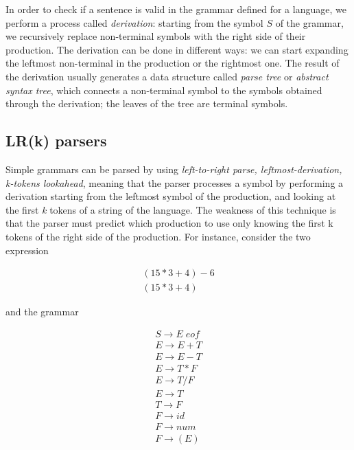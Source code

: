 In order to check if a sentence is valid in the grammar defined for a language, we perform a process called \textit{derivation}: starting from the symbol $S$ of the grammar, we recursively replace non-terminal symbols with the right side of their production. The derivation can be done in different ways: we can start expanding the leftmost non-terminal in the production or the rightmost one. The result of the derivation usually generates a data structure called \textit{parse tree} or \textit{abstract syntax tree}, which connects a non-terminal symbol to the symbols obtained through the derivation; the leaves of the tree are terminal symbols.

\subsection{LR(k) parsers}
Simple grammars can be parsed by using \textit{left-to-right parse, leftmost-derivation, k-tokens lookahead}, meaning that the parser processes a symbol by performing a derivation starting from the leftmost symbol of the production, and looking at the first \textit{k} tokens of a string of the language. The weakness of this technique is that the parser must predict which production to use only knowing the first k tokens of the right side of the production. For instance, consider the two expression

\begin{equation*}
	\begin{array}{l}
		(15 * 3 + 4) - 6\\
		(15 * 3 + 4)
	\end{array}
\end{equation*}

\noindent
and the grammar

\begin{equation*}
	\begin{array}{l}
		S \rightarrow E \; eof\\
		E \rightarrow E + T\\
		E \rightarrow E - T\\
		E \rightarrow T * F\\
		E \rightarrow T / F\\
		E \rightarrow T\\
		T \rightarrow F\\
		F \rightarrow id\\
		F \rightarrow num\\
		F \rightarrow ( E )	
	\end{array}
\end{equation*}

